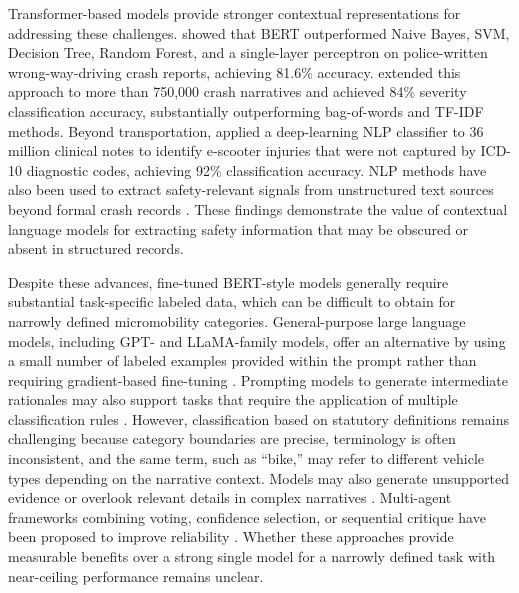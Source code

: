 \documentclass[numbered]{trbunofficial}
\begin{document}
Transformer-based models provide stronger contextual representations for addressing these challenges. \citet{Hosseini2022} showed that BERT outperformed Naive Bayes, SVM, Decision Tree, Random Forest, and a single-layer perceptron on police-written wrong-way-driving crash reports, achieving 81.6\% accuracy. \citet{Oliaee2023} extended this approach to more than 750,000 crash narratives and achieved 84\% severity classification accuracy, substantially outperforming bag-of-words and TF-IDF methods. Beyond transportation, \citet{Ioannides2022} applied a deep-learning NLP classifier to 36 million clinical notes to identify e-scooter injuries that were not captured by ICD-10 diagnostic codes, achieving 92\% classification accuracy. NLP methods have also been used to extract safety-relevant signals from unstructured text sources beyond formal crash records \cite{Avetisyan2022}. These findings demonstrate the value of contextual language models for extracting safety information that may be obscured or absent in structured records. 

Despite these advances, fine-tuned BERT-style models generally require substantial task-specific labeled data, which can be difficult to obtain for narrowly defined micromobility categories. General-purpose large language models, including GPT- and LLaMA-family models, offer an alternative by using a small number of labeled examples provided within the prompt rather than requiring gradient-based fine-tuning \citep{Brown2020, Min2022}. Prompting models to generate intermediate rationales may also support tasks that require the application of multiple classification rules \citep{Wei2022}. However, classification based on statutory definitions remains challenging because category boundaries are precise, terminology is often inconsistent, and the same term, such as “bike,” may refer to different vehicle types depending on the narrative context. Models may also generate unsupported evidence or overlook relevant details in complex narratives \citep{Ji2023, Liu2024}. Multi-agent frameworks combining voting, confidence selection, or sequential critique have been proposed to improve reliability
\citep{Liang2023, Chen2023}. Whether these approaches provide measurable benefits over a strong single model for a narrowly defined task with near-ceiling performance remains unclear.

\end{document}
